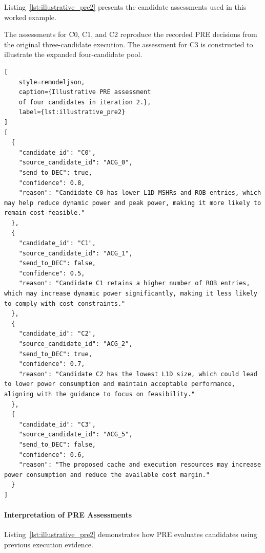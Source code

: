 Listing~\ref{lst:illustrative_pre2}
presents the candidate assessments used in
this worked example.

The assessments for C0, C1, and C2 reproduce
the recorded PRE decisions from the original
three-candidate execution. The assessment
for C3 is constructed to illustrate the
expanded four-candidate pool.

\begin{lstlisting}[
    style=remodeljson,
    caption={Illustrative PRE assessment
    of four candidates in iteration 2.},
    label={lst:illustrative_pre2}
]
[
  {
    "candidate_id": "C0",
    "source_candidate_id": "ACG_0",
    "send_to_DEC": true,
    "confidence": 0.8,
    "reason": "Candidate C0 has lower L1D MSHRs and ROB entries, which may help reduce dynamic power and peak power, making it more likely to remain cost-feasible."
  },
  {
    "candidate_id": "C1",
    "source_candidate_id": "ACG_1",
    "send_to_DEC": false,
    "confidence": 0.5,
    "reason": "Candidate C1 retains a higher number of ROB entries, which may increase dynamic power significantly, making it less likely to comply with cost constraints."
  },
  {
    "candidate_id": "C2",
    "source_candidate_id": "ACG_2",
    "send_to_DEC": true,
    "confidence": 0.7,
    "reason": "Candidate C2 has the lowest L1D size, which could lead to lower power consumption and maintain acceptable performance, aligning with the guidance to focus on feasibility."
  },
  {
    "candidate_id": "C3",
    "source_candidate_id": "ACG_5",
    "send_to_DEC": false,
    "confidence": 0.6,
    "reason": "The proposed cache and execution resources may increase power consumption and reduce the available cost margin."
  }
]
\end{lstlisting}

\paragraph{Interpretation of PRE Assessments}

Listing~\ref{lst:illustrative_pre2}
demonstrates how PRE evaluates candidates
using previous execution evidence.


